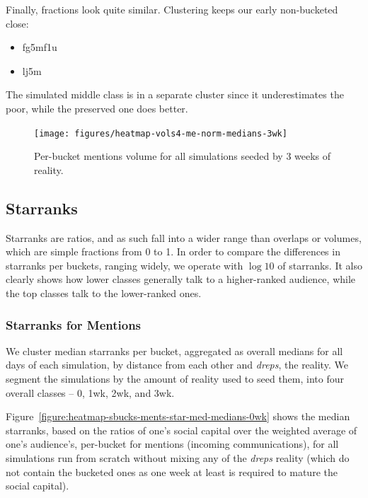 \documentclass[10pt,oneside]{memoir}
\begin{document}
Finally, fractions look quite similar.  Clustering keeps our early non-bucketed close:


\begin{itemize}


\item fg5mf1u

\item lj5m
\end{itemize}

The simulated middle class is in a separate cluster since it underestimates the poor, while the preserved one does better.



\begin{figure}
\begin{center}
    \texttt{[image: figures/heatmap-vols4-me-norm-medians-3wk]}
    \caption{Per-bucket mentions volume for all simulations seeded by 3 weeks of reality.}
    \label{figure:heatmap-vols4-me-norm-medians-3wk}
\end{center}
\end{figure}
\pagebreak \subsection{Starranks}
\label{starranks}

Starranks are ratios, and as such fall into a wider range than overlaps or volumes, which are simple fractions from 0 to 1.  In order to compare the differences in starranks per buckets, ranging widely, we operate with $\log10$ of starranks.  It also clearly shows how lower classes generally talk to a higher-ranked audience, while the top classes talk to the lower-ranked ones.


\pagebreak \subsubsection{Starranks for Mentions}
\label{starranksformentions}

We cluster median starranks per bucket, aggregated as overall medians for all days of each simulation, by distance from each other and {\itshape dreps}, the reality.  We segment the simulations by the amount of reality used to seed them, into four overall classes -- 0, 1wk, 2wk, and 3wk.


Figure~\ref{figure:heatmap-sbucks-ments-star-med-medians-0wk} shows the median starranks, based on the ratios of one's social capital over the weighted average of one's audience's, per-bucket for mentions (incoming communications), for all simulations run from scratch without mixing any of the {\itshape dreps} reality (which do not contain the bucketed ones as one week at least is required to mature the social capital).
\end{document}
